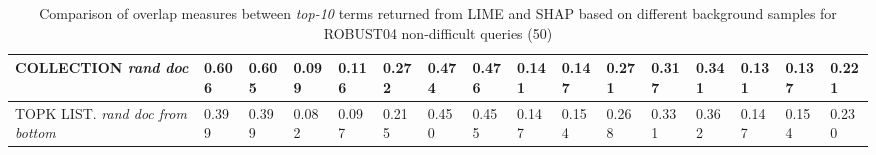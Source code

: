 \begin{table}
{\begin{tabular}{ |m{6em}|m{2em}|m{2em}|m{2em}|m{2em}|m{2.8em}||m{2em}|m{2em}|m{2em}|m{2em}|m{2.8em}||m{2em}|m{2em}|m{2em}|m{2em}|m{2.8em}|| }


COLLECTION \newline \textit{rand doc} & 0.606 & 0.605 & 0.099 & 0.116 & 0.272 & 0.474 & 0.476 & 0.141 & 0.147 & 0.271 & 0.317 & 0.341 & 0.131 & 0.137 & 0.221\\
\hline

TOPK LIST. \newline \textit{rand doc from bottom} & 0.399 & 0.399 & 0.082 & 0.097 & 0.215 & 0.450 & 0.455 & 0.147 & 0.154 & 0.268 & 0.331 & 0.362 & 0.147 & 0.154 & 0.230\\
\hline
 \end{tabular}}
\caption{Comparison of overlap measures between \textit{top-10} terms returned from LIME and SHAP based on different background samples for ROBUST04 non-difficult queries (50)}
\label{table_norm_10_terms}
\end{table}

